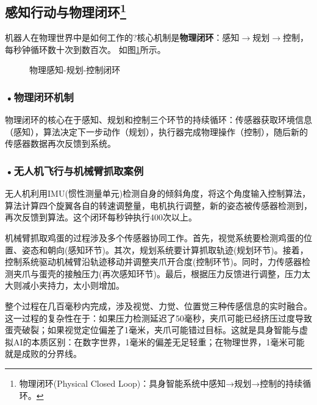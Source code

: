 
\subsection[\textbf{感知行动与物理闭环}]{感知行动与物理闭环\footnote{物理闭环(Physical Closed Loop)：具身智能系统中感知→规划→控制的持续循环。}}

机器人在物理世界中是如何工作的?核心机制是\textbf{物理闭环}：感知$\rightarrow$规划$\rightarrow$控制，每秒钟循环数十次到数百次。 如图\ref{fig:ch3_3_29}所示。

\begin{figure}[H]
\centering
{}
\caption{物理感知-规划-控制闭环}
\label{fig:ch3_3_29}
\end{figure}

\subsubsection*{\textbf{•物理闭环机制}}


物理闭环的核心在于感知、规划和控制三个环节的持续循环：传感器获取环境信息（感知），算法决定下一步动作（规划），执行器完成物理操作（控制），随后新的传感器数据再次反馈到系统。


\subsubsection*{\textbf{•无人机飞行与机械臂抓取案例}}
无人机利用IMU(惯性测量单元)检测自身的倾斜角度，将这个角度输入控制算法，算法计算四个旋翼各自的转速调整量，电机执行调整，新的姿态被传感器检测到，再次反馈到算法。这个闭环每秒钟执行400次以上。


机械臂抓取鸡蛋的过程涉及多个传感器协同工作。首先，视觉系统要检测鸡蛋的位置、姿态和朝向(感知环节)。其次，规划系统要计算抓取轨迹(规划环节)。接着，控制系统驱动机械臂沿轨迹移动并调整夹爪开合度(控制环节)。同时，力传感器检测夹爪与蛋壳的接触压力(再次感知环节)。最后，根据压力反馈进行调整，压力太大则减小夹持力，太小则增加。

整个过程在几百毫秒内完成，涉及视觉、力觉、位置觉三种传感信息的实时融合。 这一过程的复杂性在于：如果压力检测延迟了50毫秒，夹爪可能已经挤压过度导致蛋壳破裂；如果视觉定位偏差了1毫米，夹爪可能错过目标。这就是具身智能与虚拟AI的本质区别：在数字世界，1毫米的偏差无足轻重；在物理世界，1毫米可能就是成败的分界线。




